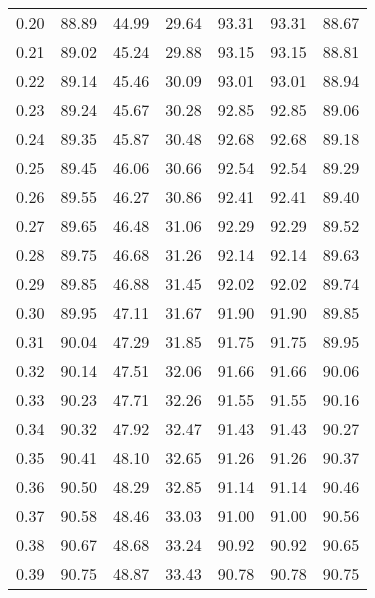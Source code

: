 \begin{tabular}{|c|c|c|c|c|c|c|}
      0.20 &     88.89 &     44.99 &      29.64 &   93.31 &      93.31 &         88.67 \\
      0.21 &     89.02 &     45.24 &      29.88 &   93.15 &      93.15 &         88.81 \\
      0.22 &     89.14 &     45.46 &      30.09 &   93.01 &      93.01 &         88.94 \\
      0.23 &     89.24 &     45.67 &      30.28 &   92.85 &      92.85 &         89.06 \\
      0.24 &     89.35 &     45.87 &      30.48 &   92.68 &      92.68 &         89.18 \\
      0.25 &     89.45 &     46.06 &      30.66 &   92.54 &      92.54 &         89.29 \\
      0.26 &     89.55 &     46.27 &      30.86 &   92.41 &      92.41 &         89.40 \\
      0.27 &     89.65 &     46.48 &      31.06 &   92.29 &      92.29 &         89.52 \\
      0.28 &     89.75 &     46.68 &      31.26 &   92.14 &      92.14 &         89.63 \\
      0.29 &     89.85 &     46.88 &      31.45 &   92.02 &      92.02 &         89.74 \\
      0.30 &     89.95 &     47.11 &      31.67 &   91.90 &      91.90 &         89.85 \\
      0.31 &     90.04 &     47.29 &      31.85 &   91.75 &      91.75 &         89.95 \\
      0.32 &     90.14 &     47.51 &      32.06 &   91.66 &      91.66 &         90.06 \\
      0.33 &     90.23 &     47.71 &      32.26 &   91.55 &      91.55 &         90.16 \\
      0.34 &     90.32 &     47.92 &      32.47 &   91.43 &      91.43 &         90.27 \\
      0.35 &     90.41 &     48.10 &      32.65 &   91.26 &      91.26 &         90.37 \\
      0.36 &     90.50 &     48.29 &      32.85 &   91.14 &      91.14 &         90.46 \\
      0.37 &     90.58 &     48.46 &      33.03 &   91.00 &      91.00 &         90.56 \\
      0.38 &     90.67 &     48.68 &      33.24 &   90.92 &      90.92 &         90.65 \\
      0.39 &     90.75 &     48.87 &      33.43 &   90.78 &      90.78 &         90.75 \\

\end{tabular}

